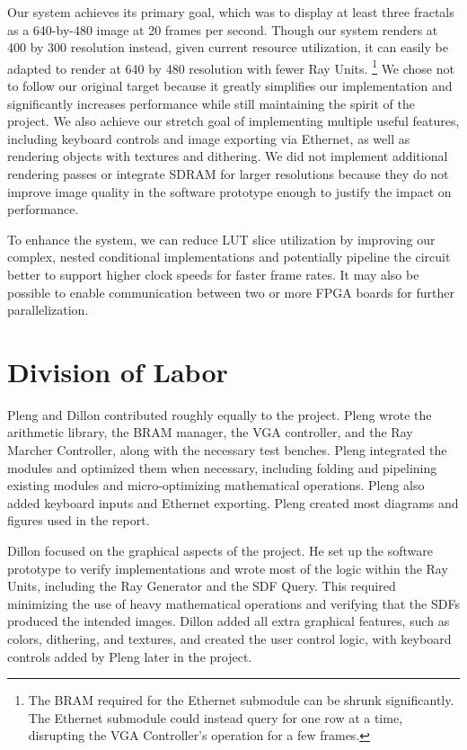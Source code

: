 \documentclass[conference]{IEEEtran}
\begin{document}
Our system achieves its primary goal, which was to display at least three fractals as a 640-by-480 image at 20 frames per second. Though our system renders at 400 by 300 resolution instead, given current resource utilization, it can easily be adapted to render at 640 by 480 resolution with fewer Ray Units. \footnote{The BRAM required for the Ethernet submodule can be shrunk significantly. The Ethernet submodule could instead query for one row at a time, disrupting the VGA Controller's operation for a few frames.} 
We chose not to follow our original target because it greatly simplifies our implementation and significantly increases performance while still maintaining the spirit of the project. We also achieve our stretch goal of implementing multiple useful features, including keyboard controls and image exporting via Ethernet, as well as rendering objects with textures and dithering. We did not implement additional rendering passes or integrate SDRAM for larger resolutions because they do not improve image quality in the software prototype enough to justify the impact on performance.

To enhance the system, we can reduce LUT slice utilization by improving our complex, nested conditional implementations and potentially pipeline the circuit better to support higher clock speeds for faster frame rates. It may also be possible to enable communication between two or more FPGA boards for further parallelization.


\section{Division of Labor}

Pleng and Dillon contributed roughly equally to the project. Pleng wrote the arithmetic library, the BRAM manager, the VGA controller, and the Ray Marcher Controller, along with the necessary test benches. Pleng integrated the modules and optimized them when necessary, including folding and pipelining existing modules and micro-optimizing mathematical operations. Pleng also added keyboard inputs and Ethernet exporting. Pleng created most diagrams and figures used in the report.

Dillon focused on the graphical aspects of the project. He set up the software prototype to verify implementations and wrote most of the logic within the Ray Units, including the Ray Generator and the SDF Query. This required minimizing the use of heavy mathematical operations and verifying that the SDFs produced the intended images. Dillon added all extra graphical features, such as colors, dithering, and textures, and created the user control logic, with keyboard controls added by Pleng later in the project.
\end{document}

